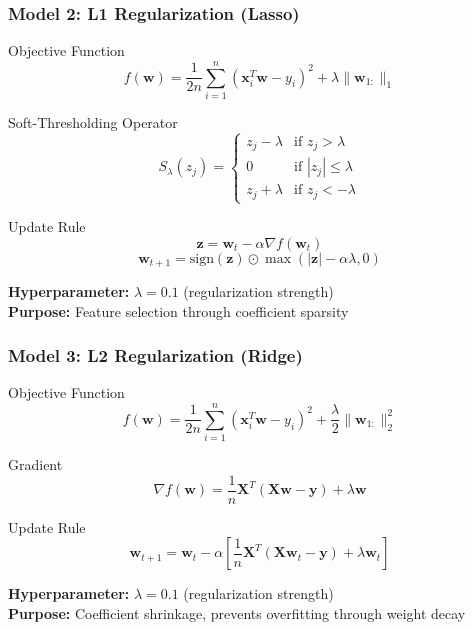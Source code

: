\documentclass[11pt,aspectratio=169]{beamer}
\begin{document}
\begin{frame}[fragile]
    \frametitle{Model 2: L1 Regularization (Lasso)}
    \begin{block}{Objective Function}
        $$f(\mathbf{w}) = \frac{1}{2n}\sum_{i=1}^{n} (\mathbf{x}_i^T\mathbf{w} - y_i)^2 + \lambda \|\mathbf{w}_{1:}\|_1$$
    \end{block}
    \begin{block}{Soft-Thresholding Operator}
        $$S_{\lambda}(z_j) = \begin{cases} 
            z_j - \lambda & \text{if } z_j > \lambda \\
            0 & \text{if } |z_j| \leq \lambda \\
            z_j + \lambda & \text{if } z_j < -\lambda
        \end{cases}$$
    \end{block}
    \begin{block}{Update Rule}
        $$\mathbf{z} = \mathbf{w}_t - \alpha \nabla f(\mathbf{w}_t)$$
        $$\mathbf{w}_{t+1} = \text{sign}(\mathbf{z}) \odot \max(|\mathbf{z}| - \alpha\lambda, 0)$$
    \end{block}
    \textbf{Hyperparameter:} $\lambda = 0.1$ (regularization strength) \\
    \textbf{Purpose:} Feature selection through coefficient sparsity
\end{frame}

\begin{frame}[fragile]
    \frametitle{Model 3: L2 Regularization (Ridge)}
    \begin{block}{Objective Function}
        $$f(\mathbf{w}) = \frac{1}{2n}\sum_{i=1}^{n} (\mathbf{x}_i^T\mathbf{w} - y_i)^2 + \frac{\lambda}{2}\|\mathbf{w}_{1:}\|_2^2$$
    \end{block}
    \begin{block}{Gradient}
        $$\nabla f(\mathbf{w}) = \frac{1}{n}\mathbf{X}^T(\mathbf{X}\mathbf{w} - \mathbf{y}) + \lambda \mathbf{w}$$
    \end{block}
    \begin{block}{Update Rule}
        $$\mathbf{w}_{t+1} = \mathbf{w}_t - \alpha \left[\frac{1}{n}\mathbf{X}^T(\mathbf{X}\mathbf{w}_t - \mathbf{y}) + \lambda \mathbf{w}_t\right]$$
    \end{block}
    \textbf{Hyperparameter:} $\lambda = 0.1$ (regularization strength) \\
    \textbf{Purpose:} Coefficient shrinkage, prevents overfitting through weight decay
\end{frame}
\end{document}

